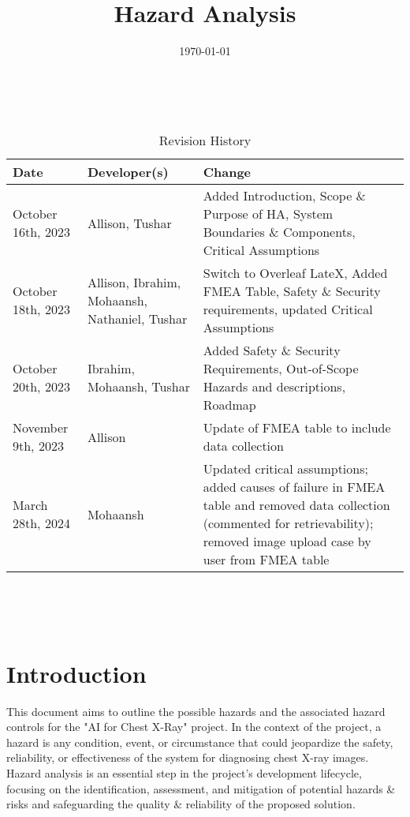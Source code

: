 \documentclass{article}
\title{Hazard Analysis\\\progname}
\author{\authname}
\date{\today}
\begin{document}
\maketitle
\thispagestyle{empty}

~\newpage


\begin{table}[hp]
\caption{Revision History} \label{TblRevisionHistory}
\begin{tabularx}{\textwidth}{p{3cm}p{4cm}X}
\toprule
\textbf{Date} & \textbf{Developer(s)} & \textbf{Change}\\
\midrule
October 16th, 2023 & Allison, Tushar & Added Introduction, Scope \& Purpose of HA, System Boundaries \& Components, Critical Assumptions\\
October 18th, 2023 & Allison, Ibrahim, Mohaansh, Nathaniel, Tushar & Switch to Overleaf LateX, Added FMEA Table, Safety \& Security requirements, updated Critical Assumptions\\
October 20th, 2023 & Ibrahim, Mohaansh, Tushar & Added Safety \& Security Requirements, Out-of-Scope Hazards and descriptions, Roadmap\\
November 9th, 2023 & Allison & Update of FMEA table to include data collection \\
March 28th, 2024 & Mohaansh & Updated critical assumptions; added causes of failure in FMEA table and removed data collection (commented for retrievability); removed image upload case by user from FMEA table\\
\bottomrule
\end{tabularx}
\end{table}

~\newpage

\tableofcontents

~\newpage


\section{Introduction}
This document aims to outline the possible hazards and the associated hazard controls for the "AI for Chest X-Ray" project. In the context of the project, a hazard is any condition, event, or circumstance that could jeopardize the safety, reliability, or effectiveness of the system for diagnosing chest X-ray images. Hazard analysis is an essential step in the project's development lifecycle, focusing on the identification, assessment, and mitigation of potential hazards \& risks and safeguarding the quality \& reliability of the proposed solution.
\end{document}
